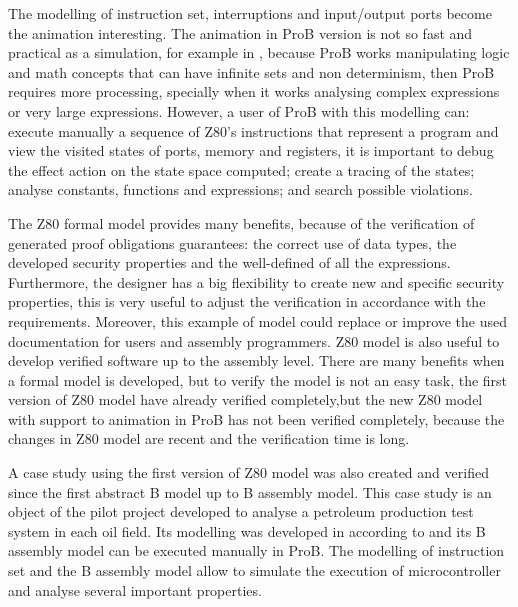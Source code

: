 \documentclass[a4paper]{llncs}
\begin{document}
The modelling of instruction set, interruptions and input/output ports become the animation interesting.
The animation in ProB version is not so fast and practical as a simulation, for example in \cite{Simulator_z80},
because ProB works manipulating logic and math concepts that can have infinite sets and non determinism, then ProB requires more processing, specially when it works analysing  complex expressions or very large expressions.
However, a user of ProB with this modelling can: execute manually a sequence of Z80's instructions that represent a program and view the visited states of ports, memory and registers, it is important to debug the effect action on the state space computed; create a tracing of the states; analyse constants, functions and expressions; and search possible violations.





The Z80 formal model provides many benefits, because of the verification of
generated proof obligations guarantees: the correct use of data types, the developed
security properties  and the well-defined of all the expressions. %
Furthermore, the designer has a big flexibility to create new and specific security properties, this is very useful
to adjust the verification in accordance with the requirements. Moreover, this
example of model could replace or improve the used documentation for users and
assembly programmers. Z80 model is also useful to develop verified software 
up to the assembly level. There are many benefits when a formal model is
developed, but to verify the model is not an easy task, the first version of Z80 model have already verified completely,but the new Z80 model with support to animation in ProB has not been verified completely,
because the changes in Z80 model are recent and the verification time is long.

A case study using the first version of Z80 model was also created and verified
since the first abstract B model up to B assembly model. This case study is an
object of the pilot project developed to analyse a petroleum production test
system in each oil field. Its modelling was developed in according to \cite{LAUT_SERGIO}
and its B assembly model can be executed manually in ProB. The modelling of
instruction set and the B assembly model allow to simulate the execution of microcontroller
and analyse several important properties.
\end{document}
